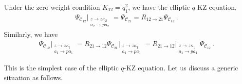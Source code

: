 \begin{proposition}
    Under the zero weight condition $K_{12} = q_1^2$, we have the elliptic $q$-KZ equation, 
    \begin{align}
        \Psi_{\mathscr{C}_{12}}\Big|_{\substack{z \to z \kappa_2 \\ a_2 \to p a_2}} = \Psi_{\mathscr{C}_{21}} = R_{12 \to 21} \Psi_{\mathscr{C}_{12}} 
        \, .
    \end{align}
    Similarly, we have 
    \begin{align}
        \Psi_{\mathscr{C}_{12}}\Big|_{\substack{z \to z \kappa_1 \\ a_1 \to p a_1}}
        = R_{21 \to 12} \Psi_{\mathscr{C}_{21}}\Big|_{\substack{z \to z \kappa_1 \\ a_1 \to p a_1}} = R_{21 \to 12}\Big|_{\substack{z \to z \kappa_1 \\ a_1 \to p a_1}} \Psi_{\mathscr{C}_{12}}
        \, .
    \end{align}
\end{proposition}
This is the simplest case of the elliptic $q$-KZ equation.
Let us discuss a generic situation as follows.


